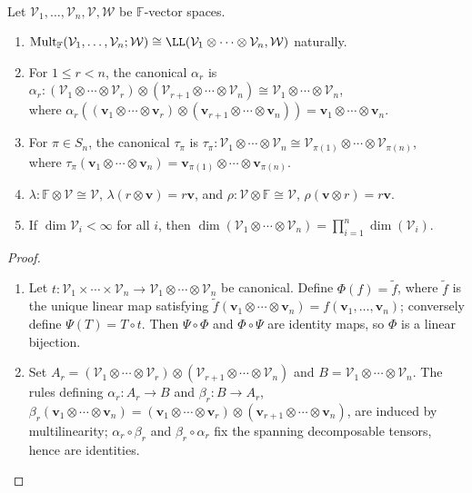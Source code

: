 \begin{theorem} \label{thm:iterated-tensor-products-basic-laws} \\
Let $\mathcal{V}_1,\ldots,\mathcal{V}_n,\mathcal{V},\mathcal{W}$ be $\mathbb{F}$-vector spaces.
\begin{enumerate}[label=(\roman*)]
\setlength{\itemsep}{0pt}
\item $\operatorname{Mult}_{\mathbb{F}}(\mathcal{V}_1,\ldots,\mathcal{V}_n;\mathcal{W})\cong\LL(\mathcal{V}_1\otimes\cdots\otimes\mathcal{V}_n,\mathcal{W})$ naturally.
\item For $1\leq r<n$, the canonical $\alpha_r$ is $\alpha_r:(\mathcal{V}_1\otimes\cdots\otimes\mathcal{V}_r)\otimes(\mathcal{V}_{r+1}\otimes\cdots\otimes\mathcal{V}_n)\cong\mathcal{V}_1\otimes\cdots\otimes\mathcal{V}_n$,\\
where $\alpha_r((\mathbf{v}_1\otimes\cdots\otimes\mathbf{v}_r)\otimes(\mathbf{v}_{r+1}\otimes\cdots\otimes\mathbf{v}_n))=\mathbf{v}_1\otimes\cdots\otimes\mathbf{v}_n$.
\item For $\pi\in S_n$, the canonical $\tau_\pi$ is $\tau_\pi:\mathcal{V}_1\otimes\cdots\otimes\mathcal{V}_n\cong\mathcal{V}_{\pi(1)}\otimes\cdots\otimes\mathcal{V}_{\pi(n)}$,\\
where $\tau_\pi(\mathbf{v}_1\otimes\cdots\otimes\mathbf{v}_n)=\mathbf{v}_{\pi(1)}\otimes\cdots\otimes\mathbf{v}_{\pi(n)}$.
\item $\lambda:\mathbb{F}\otimes\mathcal{V}\cong\mathcal{V}$, $\lambda(r\otimes\mathbf{v})=r\mathbf{v}$, and $\rho:\mathcal{V}\otimes\mathbb{F}\cong\mathcal{V}$, $\rho(\mathbf{v}\otimes r)=r\mathbf{v}$.
\item If $\dim\mathcal{V}_i<\infty$ for all $i$, then $\dim(\mathcal{V}_1\otimes\cdots\otimes\mathcal{V}_n)=\prod_{i=1}^{n}\dim(\mathcal{V}_i)$.
\end{enumerate}
\begin{proof}
\begin{enumerate}[label=(\roman*)]
\setlength{\itemsep}{0pt}
\item Let $t:\mathcal{V}_1\times\cdots\times\mathcal{V}_n\to\mathcal{V}_1\otimes\cdots\otimes\mathcal{V}_n$ be canonical. Define $\Phi(f)=\widetilde{f}$, where $\widetilde{f}$ is the unique linear map satisfying $\widetilde{f}(\mathbf{v}_1\otimes\cdots\otimes\mathbf{v}_n)=f(\mathbf{v}_1,\ldots,\mathbf{v}_n)$; conversely define $\Psi(T)=T\circ t$. Then $\Psi\circ\Phi$ and $\Phi\circ\Psi$ are identity maps, so $\Phi$ is a linear bijection.
\item Set $A_r=(\mathcal{V}_1\otimes\cdots\otimes\mathcal{V}_r)\otimes(\mathcal{V}_{r+1}\otimes\cdots\otimes\mathcal{V}_n)$ and $B=\mathcal{V}_1\otimes\cdots\otimes\mathcal{V}_n$. The rules defining $\alpha_r:A_r\to B$ and $\beta_r:B\to A_r$, $\beta_r(\mathbf{v}_1\otimes\cdots\otimes\mathbf{v}_n)=(\mathbf{v}_1\otimes\cdots\otimes\mathbf{v}_r)\otimes(\mathbf{v}_{r+1}\otimes\cdots\otimes\mathbf{v}_n)$, are induced by multilinearity; $\alpha_r\circ\beta_r$ and $\beta_r\circ\alpha_r$ fix the spanning decomposable tensors, hence are identities.

\end{enumerate}
\end{proof}
\end{theorem}
